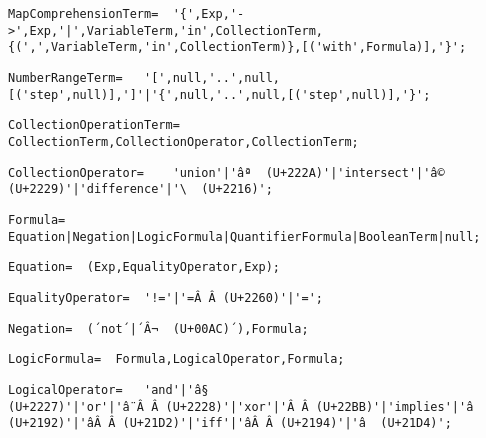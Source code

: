 \documentclass{article}
\begin{document}
    \begin{lstlisting}[mathescape=true]
     MapComprehensionTerm= 	'{',Exp,'->',Exp,'|',VariableTerm,'in',CollectionTerm,{(',',VariableTerm,'in',CollectionTerm)},[('with',Formula)],'}';
    \end{lstlisting}
    
    \begin{lstlisting}[mathescape=true]
     NumberRangeTerm= 	'[',null,'..',null,[('step',null)],']'|'{',null,'..',null,[('step',null)],'}';
    \end{lstlisting}
    
    \begin{lstlisting}[mathescape=true]
     CollectionOperationTerm= 	CollectionTerm,CollectionOperator,CollectionTerm;
    \end{lstlisting}
    
    \begin{lstlisting}[mathescape=true]
     CollectionOperator= 	'union'|'âª  (U+222A)'|'intersect'|'â©  (U+2229)'|'difference'|'\  (U+2216)';
    \end{lstlisting}
    
    \begin{lstlisting}[mathescape=true]
     Formula= 	Equation|Negation|LogicFormula|QuantifierFormula|BooleanTerm|null;
    \end{lstlisting}
    
    \begin{lstlisting}[mathescape=true]
     Equation= 	(Exp,EqualityOperator,Exp);
    \end{lstlisting}
    
    \begin{lstlisting}[mathescape=true]
     EqualityOperator= 	'!='|'=Â Â (U+2260)'|'=';
    \end{lstlisting}
    
    \begin{lstlisting}[mathescape=true]
     Negation= 	(´not´|´Â¬  (U+00AC)´),Formula;
    \end{lstlisting}
    
    \begin{lstlisting}[mathescape=true]
     LogicFormula= 	Formula,LogicalOperator,Formula;
    \end{lstlisting}
    
    \begin{lstlisting}[mathescape=true]
     LogicalOperator= 	'and'|'â§  (U+2227)'|'or'|'â¨Â Â (U+2228)'|'xor'|'Â Â (U+22BB)'|'implies'|'â  (U+2192)'|'âÂ Â (U+21D2)'|'iff'|'âÂ Â (U+2194)'|'â  (U+21D4)';
    \end{lstlisting}
    
\end{document}
